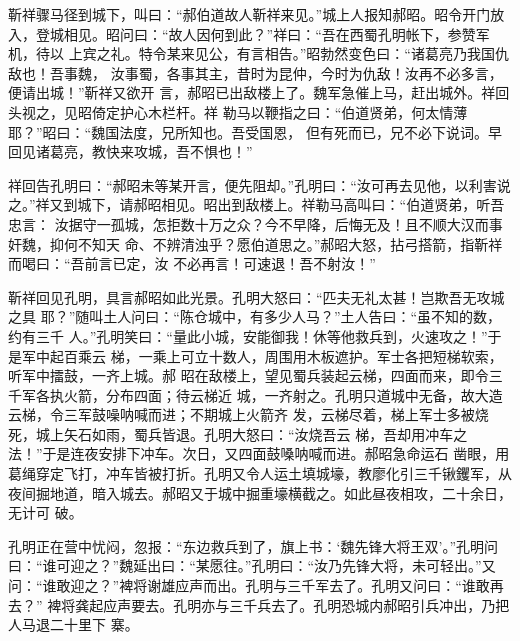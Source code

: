 靳祥骤马径到城下，叫曰：“郝伯道故人靳祥来见。”城上人报知郝昭。昭令开门放
入，登城相见。昭问曰：“故人因何到此？”祥曰：“吾在西蜀孔明帐下，参赞军机，待以
上宾之礼。特令某来见公，有言相告。”昭勃然变色曰：“诸葛亮乃我国仇敌也！吾事魏，
汝事蜀，各事其主，昔时为昆仲，今时为仇敌！汝再不必多言，便请出城！”靳祥又欲开
言，郝昭已出敌楼上了。魏军急催上马，赶出城外。祥回头视之，见昭倚定护心木栏杆。祥
勒马以鞭指之曰：“伯道贤弟，何太情薄耶？”昭曰：“魏国法度，兄所知也。吾受国恩，
但有死而已，兄不必下说词。早回见诸葛亮，教快来攻城，吾不惧也！”

祥回告孔明曰：“郝昭未等某开言，便先阻却。”孔明曰：“汝可再去见他，以利害说
之。”祥又到城下，请郝昭相见。昭出到敌楼上。祥勒马高叫曰：“伯道贤弟，听吾忠言：
汝据守一孤城，怎拒数十万之众？今不早降，后悔无及！且不顺大汉而事奸魏，抑何不知天
命、不辨清浊乎？愿伯道思之。”郝昭大怒，拈弓搭箭，指靳祥而喝曰：“吾前言已定，汝
不必再言！可速退！吾不射汝！”

靳祥回见孔明，具言郝昭如此光景。孔明大怒曰：“匹夫无礼太甚！岂欺吾无攻城之具
耶？”随叫土人问曰：“陈仓城中，有多少人马？”土人告曰：“虽不知的数，约有三千
人。”孔明笑曰：“量此小城，安能御我！休等他救兵到，火速攻之！”于是军中起百乘云
梯，一乘上可立十数人，周围用木板遮护。军士各把短梯软索，听军中擂鼓，一齐上城。郝
昭在敌楼上，望见蜀兵装起云梯，四面而来，即令三千军各执火箭，分布四面；待云梯近
城，一齐射之。孔明只道城中无备，故大造云梯，令三军鼓噪呐喊而进；不期城上火箭齐
发，云梯尽着，梯上军士多被烧死，城上矢石如雨，蜀兵皆退。孔明大怒曰：“汝烧吾云
梯，吾却用冲车之法！”于是连夜安排下冲车。次日，又四面鼓嗓呐喊而进。郝昭急命运石
凿眼，用葛绳穿定飞打，冲车皆被打折。孔明又令人运土填城壕，教廖化引三千锹钁军，从
夜间掘地道，暗入城去。郝昭又于城中掘重壕横截之。如此昼夜相攻，二十余日，无计可
破。

孔明正在营中忧闷，忽报：“东边救兵到了，旗上书：‘魏先锋大将王双’。”孔明问
曰：“谁可迎之？”魏延出曰：“某愿往。”孔明曰：“汝乃先锋大将，未可轻出。”又
问：“谁敢迎之？”裨将谢雄应声而出。孔明与三千军去了。孔明又问曰：“谁敢再去？”
裨将龚起应声要去。孔明亦与三千兵去了。孔明恐城内郝昭引兵冲出，乃把人马退二十里下
寨。

